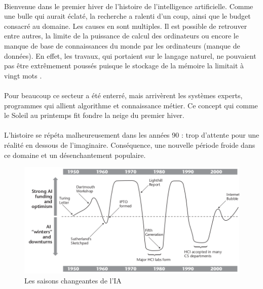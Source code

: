 \documentclass[10pt, french, a4paper]{article}
\begin{document}
\paragraph{}
Bienvenue dans le premier hiver de l’histoire de l’intelligence artificielle. Comme une bulle qui aurait éclaté, la recherche a ralenti d’un coup, ainsi que le budget consacré au domaine. Les causes en sont multiples. Il est possible de retrouver entre autres, la limite de la puissance de calcul des ordinateurs ou encore le manque de base de connaissances du monde par les ordinateurs (manque de données). En effet, les travaux, qui portaient sur le langage naturel, ne pouvaient pas être extrêmement poussés puisque le stockage de la mémoire la limitait à vingt mots \citep{crevier_ai:_1992}.

\paragraph{}
Pour beaucoup ce secteur a été enterré, mais arrivèrent les systèmes experts, programmes qui allient algorithme et connaissance métier. Ce concept qui comme le Soleil au printemps fit fondre la neige du premier hiver.

\paragraph{}
L’histoire se répéta malheureusement dans les années 90 : trop d’attente pour une réalité en dessous de l’imaginaire. Conséquence, une nouvelle période froide dans ce domaine et un désenchantement populaire.

\begin{center}
    \begin{figure}[hbt!]
        \includegraphics[width=\textwidth]{images/grudin_2009_changing_seasons_ai.png}
        \caption{Les saisons changeantes de l'IA \citep{grudin_ai_2009}}
    \end{figure}
\end{center}
\end{document}
